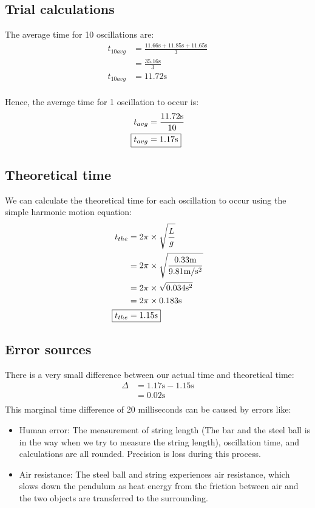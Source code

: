 \documentclass[a4paper,12pt]{article}
\begin{document}
	\subsection{Trial calculations}
	The average time for 10 oscillations are:
	\begin{align*}
		t_{10avg}&=\frac{11.66\text{s}+11.85\text{s}+11.65\text{s}}{3}\\
		&=\frac{35.16\text{s}}{3} \\
		t_{10avg}&=11.72\text{s}\\
	\end{align*}
	
	Hence, the average time for 1 oscillation to occur is:
	\begin{align*}
		t_{avg}&=\frac{11.72\text{s}}{10}\\
		\Aboxed{t_{avg}&=1.17\text{s}}
	\end{align*}
	
	\subsection{Theoretical time}
	We can calculate the theoretical time for each oscillation to occur using the simple harmonic motion equation:
	\begin{align*}
		t_{the}&=2\pi\times\sqrt{\frac{L}{g}}\\
		&=2\pi\times\sqrt{\frac{0.33\text{m}}{9.81\text{m}/\text{s}^2}}  \\
		&=2\pi\times\sqrt{0.034\text{s}^2}\\
		&=2\pi\times 0.183\text{s} \\
		\Aboxed{t_{the}&=1.15\text{s}}
	\end{align*} 
	\newpage
	\subsection{Error sources}
	There is a very small difference between our actual time and theoretical time: 
	\begin{align*}
		\Delta&=1.17\text{s}-1.15\text{s} \\
		&=0.02\text{s}\\
	\end{align*}
	This marginal time difference of 20 milliseconds can be caused by errors like:
	\begin{itemize}
		\item Human error: The measurement of string length (The bar and the steel ball is in the way when we try to measure the string length), oscillation time, and calculations are all rounded. Precision is loss during this process. 
		\item Air resistance: The steel ball and string experiences air resistance, which slows down the pendulum as heat energy from the friction between air and the two objects are transferred to the surrounding.
	\end{itemize}
\end{document}
